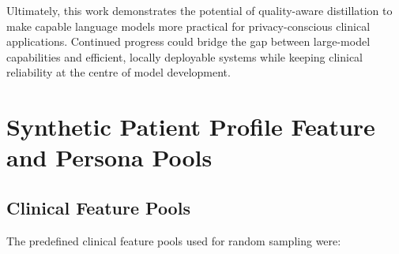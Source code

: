 \documentclass[ %
                    author={Aman Kumar Singh},
                supervisor={Dr. Edwin Simpson},
                    degree={MSc},
                     title={Quality-Aware Knowledge Distillation of Large Language Models for Efficient Personalised Clinical Report Generation},
                  subtitle={},
                      type={},
                      year={2021}]{dissertation}
\begin{document}
Ultimately, this work demonstrates the potential of quality-aware distillation
to make capable language models more practical for privacy-conscious clinical
applications. Continued progress could bridge the gap between large-model
capabilities and efficient, locally deployable systems while keeping clinical
reliability at the centre of model development.



%
%

\backmatter





\appendix

\chapter{Synthetic Patient Profile Feature and Persona Pools}
\label{appx:profile_pools}


\section{Clinical Feature Pools}

The predefined clinical feature pools used for random sampling were:
\end{document}
